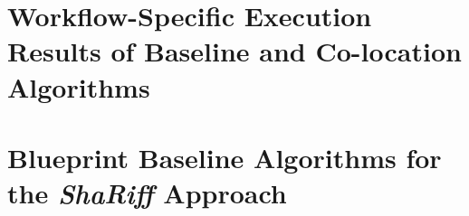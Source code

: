 \appendix
\section{Workflow-Specific Execution Results of Baseline and Co-location Algorithms}
\section{Blueprint Baseline Algorithms for the \textit{ShaRiff} Approach}